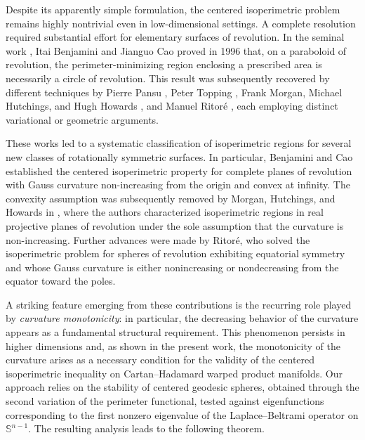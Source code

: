 \documentclass[a4paper,11pt,reqno]{amsart}
\theoremstyle{plain}
\numberwithin{equation}{section} \allowdisplaybreaks
\newcommand{\sn}{\mathbb{S}^{n-1}}
\begin{document}
\medskip 

Despite its apparently simple formulation, the centered isoperimetric problem remains highly nontrivial even in low-dimensional settings. A complete resolution required substantial effort for elementary surfaces of revolution. In the seminal work \cite{CB}, Itai Benjamini and Jianguo Cao proved in 1996 that, on a paraboloid of revolution, the perimeter-minimizing region enclosing a prescribed area is necessarily a circle of revolution. This result was subsequently recovered by different techniques by Pierre Pansu \cite{Pansu}, Peter Topping \cite{Topping}, Frank Morgan, Michael Hutchings, and Hugh Howards \cite{FMH}, and Manuel Ritor\'e \cite{M Ritore}, each employing distinct variational or geometric arguments.

These works led to a systematic classification of isoperimetric regions for several new classes of rotationally symmetric surfaces. In particular, Benjamini and Cao established the centered isoperimetric property for complete planes of revolution with Gauss curvature non-increasing from the origin and convex at infinity. The convexity assumption was subsequently removed by Morgan, Hutchings, and Howards in \cite{FMH}, where the authors characterized isoperimetric regions in real projective planes of revolution under the sole assumption that the curvature is non-increasing. Further advances were made by Ritor\'e, who solved the isoperimetric problem for spheres of revolution exhibiting equatorial symmetry and whose Gauss curvature is either nonincreasing or nondecreasing from the equator toward the poles.

A striking feature emerging from these contributions is the recurring role played by \textit{curvature monotonicity}: in particular, the decreasing behavior of the curvature appears as a fundamental structural requirement. This phenomenon persists in higher dimensions and, as shown in the present work, the monotonicity of the curvature arises as a necessary condition for the validity of the centered isoperimetric inequality on Cartan–Hadamard warped product manifolds. Our approach relies on the stability of centered geodesic spheres, obtained through the second variation of the perimeter functional, tested against eigenfunctions corresponding to the first nonzero eigenvalue of the Laplace--Beltrami operator on $\sn$. The resulting analysis leads to the following theorem.
\end{document}
